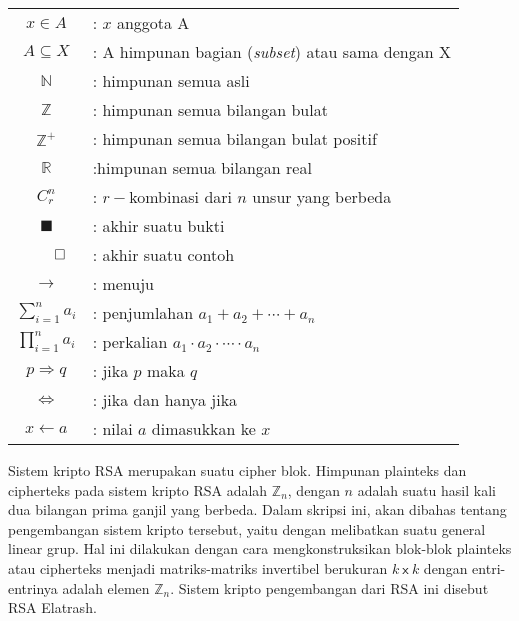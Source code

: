 \documentclass[skripsi]{unhasskripsi}
\theoremstyle{definition}
\begin{document}
    \lambang
    \begin{tabular}{cp{10cm}}
        $x\in A$ & : $x$ anggota A\\
        $A\subseteq X$ & : A himpunan bagian (\textit{subset}) atau sama dengan X\\
        $\mathbb{N}$ & : himpunan semua asli\\
        $\mathbb{Z}$ & : himpunan semua bilangan bulat\\
        $\mathbb{Z}^{+}$ & : himpunan semua bilangan bulat positif\\
        $\mathbb{R}$ & :himpunan semua bilangan real\\
        $C^{n}_{r}$ & : $r-$kombinasi dari $n$ unsur yang berbeda\\
        $\blacksquare$ & : akhir suatu bukti\\
        $\qed$\hfill & : akhir suatu contoh\\
        $\rightarrow$ & : menuju\\
        $\displaystyle\sum_{i=1}^{n}{a_{i}}$ & : penjumlahan $a_{1}+a_{2}+\cdots + a_{n}$\\
        $\displaystyle\prod_{i=1}^{n}{a_{i}}$ & : perkalian $a_{1}\cdot a_{2}\cdot\cdots \cdot a_{n}$\\
        $p \Rightarrow q$ & : jika $p$ maka $q$\\
        $\Leftrightarrow$ & : jika dan hanya jika\\
        $x\leftarrow a$ & : nilai $a$ dimasukkan ke $x$
    \end{tabular}


    \begin{abstractind}
        Sistem kripto RSA merupakan suatu cipher blok. Himpunan plainteks dan cipherteks pada sistem kripto RSA adalah $\mathbb{Z}_{n}$, dengan $n$ adalah suatu hasil kali dua bilangan prima ganjil yang berbeda. Dalam skripsi ini, akan dibahas tentang pengembangan sistem kripto tersebut, yaitu dengan melibatkan suatu general linear grup. Hal ini dilakukan de\-ngan cara mengkonstruksikan blok-blok plainteks atau cipherteks menjadi matriks-matriks invertibel berukuran \mbox{$k \ \mathsf{x} \ k$} dengan entri-entrinya adalah elemen $\mathbb{Z}_{n}$. Sistem kripto pengembangan dari RSA ini disebut RSA Elatrash.
    \end{abstractind}
\end{document}
